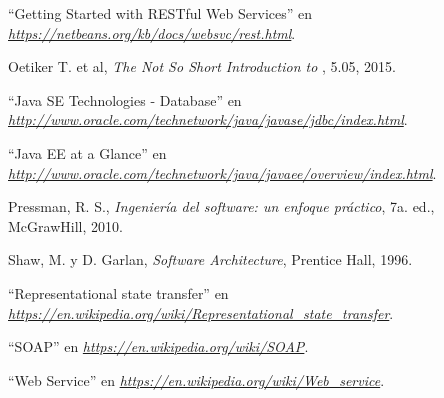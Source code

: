 \begin{thebibliography}{}
	``Getting Started with RESTful Web Services'' en
	\emph{\url{https://netbeans.org/kb/docs/websvc/rest.html}}.
	
	Oetiker T. et al,
	\emph{The Not So Short Introduction to \LaTeXe},
	5.05,
	2015.
	
	``Java SE Technologies - Database'' en	
	\emph{\url{http://www.oracle.com/technetwork/java/javase/jdbc/index.html}}.
	
	``Java EE at a Glance'' en
	\emph{\url{http://www.oracle.com/technetwork/java/javaee/overview/index.html}}.
	
	Pressman, R. S.,
	\emph{Ingeniería del software: un enfoque práctico},
	7a. ed.,
	McGrawHill,
	2010.
	
	Shaw, M. y D. Garlan, 
	\emph{Software Architecture}, 
	Prentice Hall, 
	1996.
	
	``Representational state transfer'' en
	\emph{\url{https://en.wikipedia.org/wiki/Representational_state_transfer}}.
	
	``SOAP'' en
	\emph{\url{https://en.wikipedia.org/wiki/SOAP}}.
	
	``Web Service'' en
	\emph{\url{https://en.wikipedia.org/wiki/Web_service}}.

\end{thebibliography}